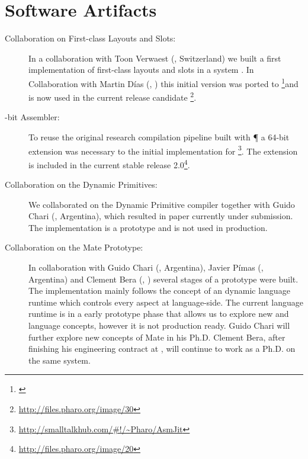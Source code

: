 \section{Software Artifacts}
\begin{description}
	\item[Collaboration on First-class Layouts and Slots:]
In a collaboration with Toon Verwaest (\SCG, Switzerland) we built a first implementation of first-class layouts and slots in a \ST system \cite{Verw11a}.
In Collaboration with Martin Días (\RMoD, \INRIA) this initial version was ported to \PH\footnote{\url{}}and is now used in the current release candidate \footnote{\url{http://files.pharo.org/image/30}}.

	\item[-bit Assembler:]
To reuse the original research compilation pipeline built with \P \cite{Verw10a, Brun11a} a 64-bit extension was necessary to the initial \AsmJIT implementation for \PH\footnote{\url{http://smalltalkhub.com/\#!/~Pharo/AsmJit}}.
The extension is included in the current stable \PH release 2.0\footnote{\url{http://files.pharo.org/image/20}}.

	\item[Collaboration on the \WF Dynamic Primitives:]
We collaborated on the \WF Dynamic Primitive compiler together with Guido Chari (\UBA, Argentina), which resulted in paper currently under submission\cite{Char13a}.
The implementation is a prototype and is not used in production.

	\item[Collaboration on the Mate \VM Prototype:]
In collaboration with Guido Chari (\UBA, Argentina), Javier Pímas (\UBA, Argentina) and Clement Bera (\RMoD, \INRIA) several stages of a prototype \VM were built.
The implementation mainly follows the concept of an dynamic language runtime which controls every aspect at language-side.
The current language runtime is in a early prototype phase that allows us to explore new \VM and language concepts, however it is not production ready.
Guido Chari will further explore new concepts of Mate in his Ph.D.
Clement Bera, after finishing his engineering contract at \RMoD, will continue to work as a Ph.D. on the same system.


\end{description}
